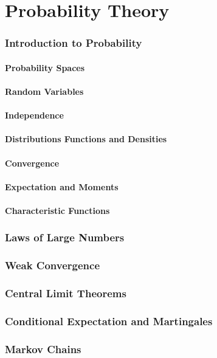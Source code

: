 \documentclass{article}
\theoremstyle{definition}
\begin{document}
	\part{Probability Theory}
	\section{Introduction to Probability}
	\subsection{Probability Spaces}
	\subsection{Random Variables}
	\subsection{Independence}
	\subsection{Distributions Functions and Densities}
	\subsection{Convergence}
	\subsection{Expectation and Moments}
	\subsection{Characteristic Functions}
	\section{Laws of Large Numbers}
	\section{Weak Convergence}
	\section{Central Limit Theorems}
	\section{Conditional Expectation and Martingales}
	\section{Markov Chains}
\end{document}
